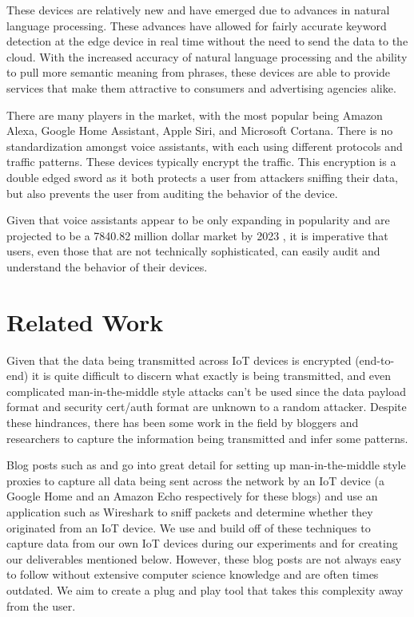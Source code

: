 \documentclass[letterpaper,twocolumn,10pt]{article}
\begin{document}
These devices are relatively new and have emerged due to advances in natural language processing. These advances have allowed for fairly accurate keyword detection at the edge device in real time without the need to send the data to the cloud. With the increased accuracy of natural language processing and the ability to pull more semantic meaning from phrases, these devices are able to provide services that make them attractive to consumers and advertising agencies alike.

There are many players in the market, with the most popular being Amazon Alexa, Google Home Assistant, Apple Siri, and Microsoft Cortana. There is no standardization amongst voice assistants, with each using different protocols and traffic patterns. These devices typically encrypt the traffic. This encryption is a double edged sword as it both protects a user from attackers sniffing their data, but also prevents the user from auditing the behavior of the device. 

Given that voice assistants appear to be only expanding in popularity and are projected to be a 7840.82 million dollar market by 2023 \cite{market_reports}, it is imperative that users, even those that are not technically sophisticated, can easily audit and understand the behavior of their devices.

\section{Related Work}

Given that the data being transmitted across IoT devices is encrypted (end-to-end) it is quite difficult to discern what exactly is being transmitted, and even complicated man-in-the-middle style attacks can’t be used since the data payload format and security cert/auth format are unknown to a random attacker. Despite these hindrances, there has been some work in the field by bloggers and researchers to capture the information being transmitted and infer some patterns. 

Blog posts such as \cite{ghadiry_2017} and \cite{morgenstern_morgenstern_2018} go into great detail for setting up man-in-the-middle style proxies to capture all data being sent across the network by an IoT device (a Google Home and an Amazon Echo respectively for these blogs) and use an application such as Wireshark to sniff packets and determine whether they originated from an IoT device. We use and build off of these techniques to capture data from our own IoT devices during our experiments and for creating our deliverables mentioned below. However, these blog posts are not always easy to follow without extensive computer science knowledge and are often times outdated. We aim to create a plug and play tool that takes this complexity away from the user.
\end{document}
